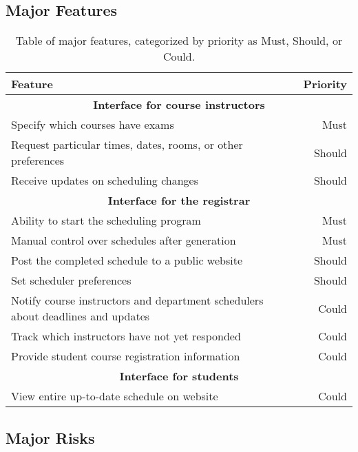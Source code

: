 \documentclass[11pt]{article}
\begin{document}
\subsection{Major Features} %
\begin{table}[htbp]
  \centering
  \begin{tabular} {| l | r |}
    \hline
    \textbf{Feature} & \textbf{Priority} \\ \hline \hline
    \multicolumn{2}{|c|}{\textbf{Interface for course instructors}} \\ \hline
    Specify which courses have exams & Must \\ \hline
    Request particular times, dates, rooms, or other preferences & Should \\ \hline
    Receive updates on scheduling changes & Should \\ \hline
    \multicolumn{2}{|c|}{\textbf{Interface for the registrar}} \\ \hline
    Ability to start the scheduling program & Must \\ \hline
    Manual control over schedules after generation & Must \\ \hline
    Post the completed schedule to a public website & Should \\ \hline
    Set scheduler preferences & Should \\ \hline
    Notify course instructors and department schedulers about deadlines and updates & Could \\ \hline
    Track which instructors have not yet responded & Could \\ \hline
    Provide student course registration information & Could \\ \hline %
    \multicolumn{2}{|c|}{\textbf{Interface for students}} \\ \hline
    View entire up-to-date schedule on website & Could \\ \hline
  \end{tabular}
  \caption{Table of major features, categorized by priority as Must, Should, or Could.}
\end{table}

\subsection{Major Risks} %
\end{document}
